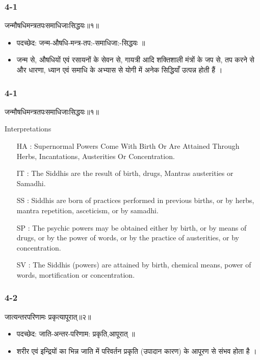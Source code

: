 \begin{frame}[fragile]\frametitle{4-1}
\begin{sanskrit}
जन्मौषधिमन्त्रतपःसमाधिजाःसिद्धयः॥१॥
\end{sanskrit}

\begin{itemize}
\item पदच्छेद:  जन्म-औषधि-मन्त्र-तप:-समाधिजा:-सिद्धयः ॥
\item जन्म से, औषधियों एवं रसायनों के सेवन से, गायत्री आदि शक्तिशाली मंत्रों के जप से, तप करने से और धारणा, ध्यान एवं समाधि के अभ्यास से योगी में अनेक सिद्धियाँ उत्पन्न होती हैं ।
\end{itemize}
\end{frame}

\begin{frame}[fragile]\frametitle{4-1}
\begin{sanskrit}
जन्मौषधिमन्त्रतपःसमाधिजाःसिद्धयः॥१॥
\end{sanskrit}

Interpretations
\begin{itemize}	
\item [HA]: Supernormal Powers Come With Birth Or Are Attained Through Herbs, Incantations, Austerities Or Concentration.
\item [IT]: The Siddhis are the result of birth, drugs, Mantras austerities or Samadhi.
\item [SS]: Siddhis are born of practices performed in previous births, or by herbs, mantra repetition, asceticism, or by samadhi.
\item [SP]: The psychic powers may be obtained either by birth, or by means of drugs, or by the power of words, or by the practice of austerities, or by concentration.
\item [SV]: The Siddhis (powers) are attained by birth, chemical means, power of words, mortification or concentration. 
\end{itemize}
\end{frame}

\begin{frame}[fragile]\frametitle{4-2}
\begin{sanskrit}
जात्यन्तरपरिणामः प्रकृत्यापूरात्॥२॥
\end{sanskrit}

\begin{itemize}
\item पदच्छेद:  जाति-अन्तर-परिणाम: प्रकृति,आपूरात् ‌॥
\item शरीर एवं इन्द्रियों का भिन्न जाति में परिवर्तन प्रकृति (उपादान कारण) के आपूरण से संभव होता है ।
\end{itemize}
\end{frame}

